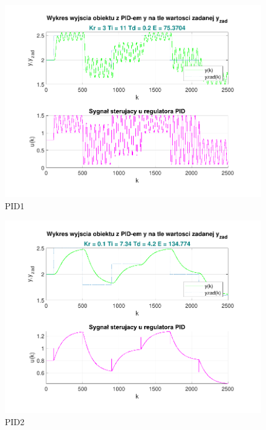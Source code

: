\begin{figure}[H]
    \centering
    \includegraphics[scale=0.90]{../projekt/zad4_5/PID_pdf/PID_1.pdf}
    \caption{PID1}
\end{figure}

\begin{figure}[H]
    \centering
    \includegraphics[scale=0.90]{../projekt/zad4_5/PID_pdf/PID_2.pdf}
    \caption{PID2}
\end{figure}

